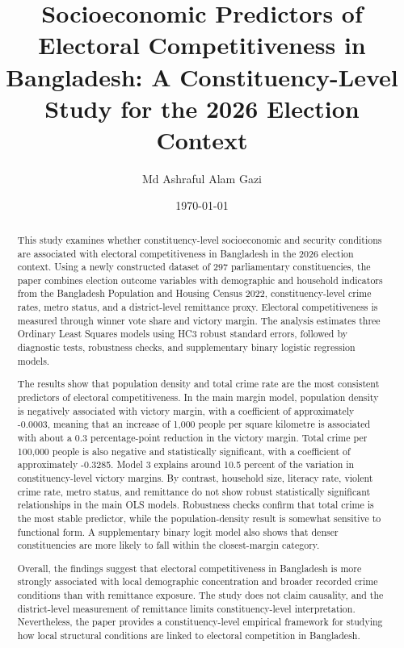 \documentclass[12pt,a4paper]{article}
\title{Socioeconomic Predictors of Electoral Competitiveness in Bangladesh: 
A Constituency-Level Study for the 2026 Election Context}
\author{Md Ashraful Alam Gazi}
\date{\today}
\begin{document}
\maketitle

\begin{abstract}

This study examines whether constituency-level socioeconomic and security conditions are associated with electoral competitiveness in Bangladesh in the 2026 election context. Using a newly constructed dataset of 297 parliamentary constituencies, the paper combines election outcome variables with demographic and household indicators from the Bangladesh Population and Housing Census 2022, constituency-level crime rates, metro status, and a district-level remittance proxy. Electoral competitiveness is measured through winner vote share and victory margin. The analysis estimates three Ordinary Least Squares models using HC3 robust standard errors, followed by diagnostic tests, robustness checks, and supplementary binary logistic regression models.

The results show that population density and total crime rate are the most consistent predictors of electoral competitiveness. In the main margin model, population density is negatively associated with victory margin, with a coefficient of approximately -0.0003, meaning that an increase of 1,000 people per square kilometre is associated with about a 0.3 percentage-point reduction in the victory margin. Total crime per 100,000 people is also negative and statistically significant, with a coefficient of approximately -0.3285. Model 3 explains around 10.5 percent of the variation in constituency-level victory margins. By contrast, household size, literacy rate, violent crime rate, metro status, and remittance do not show robust statistically significant relationships in the main OLS models. Robustness checks confirm that total crime is the most stable predictor, while the population-density result is somewhat sensitive to functional form. A supplementary binary logit model also shows that denser constituencies are more likely to fall within the closest-margin category.

Overall, the findings suggest that electoral competitiveness in Bangladesh is more strongly associated with local demographic concentration and broader recorded crime conditions than with remittance exposure. The study does not claim causality, and the district-level measurement of remittance limits constituency-level interpretation. Nevertheless, the paper provides a constituency-level empirical framework for studying how local structural conditions are linked to electoral competition in Bangladesh.

\end{abstract}
\end{document}
